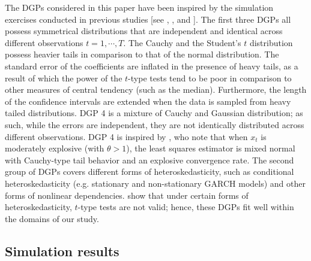 \documentclass[harvard,11pt]{article}
\begin{document}
The DGPs considered in this paper have been inspired by the simulation exercises conducted in previous studies [see \citet{mankiw1986we}, \citet{dufour1995exact}, \citet{coudin2009finite} and \citet{dufour2010exact}]. The first three DGPs all possess symmetrical distributions that are independent and identical across different observations $t=1,\cdots,T$. The Cauchy and the Student's $t$ distribution possess heavier tails in comparison to that of the normal distribution. The standard error of the coefficients are inflated in the presence of heavy tails, as a result of which the power of the $t$-type tests tend to be poor in comparison to other measures of central tendency (such as the median). Furthermore, the length of the confidence intervals are extended when the data is sampled from heavy tailed distributions. DGP 4 is a mixture of Cauchy and Gaussian distribution; as such, while the errors are independent, they are not identically distributed across different observations. DGP 4 is inspired by \citet{magdalinos2009limit}, who note that when $x_t$ is moderately explosive (with $\theta>1$), the least squares estimator is mixed normal with Cauchy-type tail behavior and an explosive convergence rate. The second group of DGPs covers different forms of heteroskedasticity, such as conditional heteroskedasticity (e.g. stationary and non-stationary GARCH models) and other forms of nonlinear dependencies. \citet{dufour2010exact} show that under certain forms of heteroskedasticity, $t$-type tests are not valid; hence, these DGPs fit well within the domains of our study.  

\subsection{Simulation results \label{sec: Simulation results}}
\end{document}
